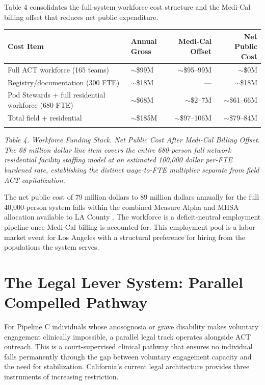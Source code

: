 \documentclass[12pt, letterpaper]{article}
\begin{document}
\clearpage

Table 4 consolidates the full-system workforce cost structure and the Medi-Cal billing offset that reduces net public expenditure.

{\singlespacing
\begin{tabularx}{\textwidth}{@{}lXrr@{}}
\toprule
\rowcolor{rowgray}
Cost Item & Annual Gross & Medi-Cal Offset & Net Public Cost \\
\midrule
Full ACT workforce (165 teams) & $\sim$\$99M & $\sim$\$95--99M & $\sim$\$0M \\
\rowcolor{rowgray}
Registry/documentation (300 FTE) & $\sim$\$18M & --- & $\sim$\$18M \\
Pod Stewards + full residential workforce (680 FTE) & $\sim$\$68M & $\sim$\$2--7M & $\sim$\$61--66M \\
\midrule
Total field + residential & $\sim$\$185M & $\sim$\$97--106M & $\sim$\$79--84M \\
\addlinespace[4pt]
\bottomrule
\end{tabularx}\par
\vspace{8pt}
\noindent\textit{Table 4. Workforce Funding Stack. Net Public Cost After Medi-Cal Billing Offset. The 68 million dollar line item covers the entire 680-person full network residential facility staffing model at an estimated 100,000 dollar per-FTE burdened rate, establishing the distinct wage-to-FTE multiplier separate from field ACT capitalization.}
\par}
The net public cost of 79 million dollars to 89 million dollars annually for the full 40,000-person system falls within the combined Measure Alpha and MHSA allocation available to LA County \citep{lac_ceo_measure_a_2025}. The workforce is a deficit-neutral employment pipeline once Medi-Cal billing is accounted for. This employment pool is a labor market event for Los Angeles with a structural preference for hiring from the populations the system serves.

\clearpage
\section{The Legal Lever System: Parallel Compelled Pathway}

For Pipeline C individuals whose anosognosia or grave disability makes voluntary engagement clinically impossible, a parallel legal track operates alongside ACT outreach. This is a court-supervised clinical pathway that ensures no individual falls permanently through the gap between voluntary engagement capacity and the need for stabilization. California's current legal architecture provides three instruments of increasing restriction.
\end{document}
